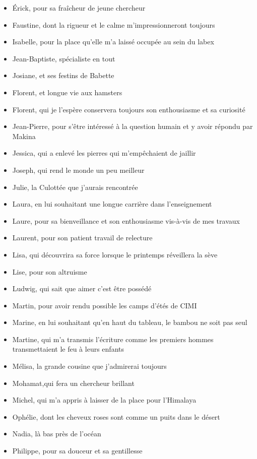 {\begin{itemize}[label=\ ]
\item Érick, pour sa fraîcheur de jeune chercheur
\item Faustine, dont la rigueur et le calme m'impressionneront toujours
\item Isabelle, pour la place qu'elle m'a laissé occupée au sein du labex 
\item Jean-Baptiste, spécialiste en tout
\item Josiane, et ses festins de Babette
\item Florent, et longue vie aux hamsters
\item Florent, qui je l'espère conservera toujours son enthousiasme et sa curiosité 
\item Jean-Pierre, pour s'être intéressé à la question humain et y avoir répondu par Makina 
\item Jessica, qui a enlevé les pierres qui m’empêchaient de jaillir 
\item Joseph, qui rend le monde un peu meilleur 
\item Julie, la Culottée que j'aurais rencontrée 
\item Laura, en lui souhaitant une longue carrière dans l'enseignement 
\item Laure, pour sa bienveillance et son enthousiasme vis-à-vis de mes travaux 
\item Laurent, pour son patient travail de relecture 
\item Lisa, qui découvrira sa force lorsque le printemps réveillera la sève
\item Lise, pour son altruisme  
\item Ludwig, qui sait que aimer c'est être possédé
\item Martin, pour avoir rendu possible les camps d'étés de CIMI
\item Marine, en lui souhaitant qu'en haut du tableau, le bambou ne soit pas seul
\item Martine, qui m'a transmis l'écriture comme les premiers hommes transmettaient le feu à leurs enfants 
\item Mélisa, la grande cousine que j'admirerai toujours
\item Mohamat,qui fera un chercheur brillant 
\item Michel, qui m'a appris à laisser de la place pour l'Himalaya 
\item Ophélie, dont les cheveux roses sont comme un puits dans le désert 
\item Nadia, là bas près de l'océan 
\item Philippe, pour sa douceur et sa gentillesse

\end{itemize}}
